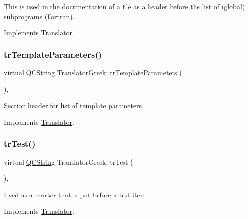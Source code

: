 This is used in the documentation of a file as a header before the list of (global) subprograms (Fortran). 

Implements \mbox{\hyperlink{class_translator}{Translator}}.

\mbox{\label{class_translator_greek_a35c1deba9bd237da80d6483544046c77}} 
\subsubsection{\texorpdfstring{trTemplateParameters()}{trTemplateParameters()}}
{\footnotesize\ttfamily virtual \mbox{\hyperlink{class_q_c_string}{Q\+C\+String}} Translator\+Greek\+::tr\+Template\+Parameters (\begin{DoxyParamCaption}{ }\end{DoxyParamCaption})\hspace{0.3cm}{\ttfamily [inline]}, {\ttfamily [virtual]}}

Section header for list of template parameters 

Implements \mbox{\hyperlink{class_translator}{Translator}}.

\mbox{\label{class_translator_greek_ad7c08067e2309c97d590cac94cfd24ee}} 
\subsubsection{\texorpdfstring{trTest()}{trTest()}}
{\footnotesize\ttfamily virtual \mbox{\hyperlink{class_q_c_string}{Q\+C\+String}} Translator\+Greek\+::tr\+Test (\begin{DoxyParamCaption}{ }\end{DoxyParamCaption})\hspace{0.3cm}{\ttfamily [inline]}, {\ttfamily [virtual]}}

Used as a marker that is put before a test item 

Implements \mbox{\hyperlink{class_translator}{Translator}}.

\mbox{\label{class_translator_greek_aeb73968eb636bf905515ff4d662979d1}} 
